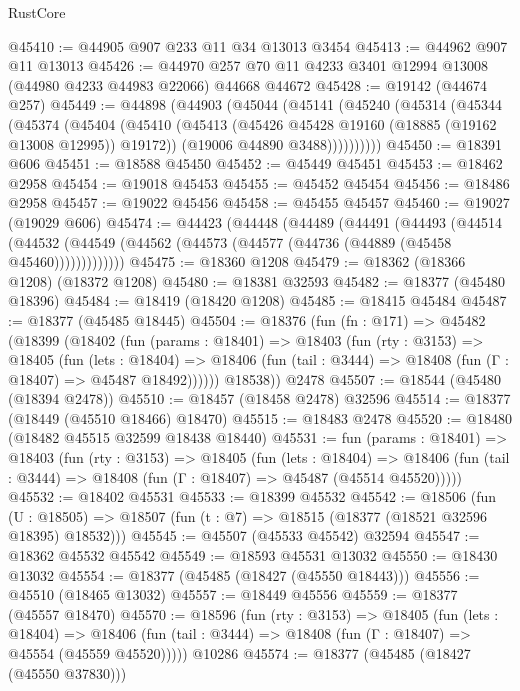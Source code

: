 \begin{lexlean}{RustCore}
\begin{coremodule}
@45410 := @44905 @907 @233 @11 @34 @13013 @3454
@45413 := @44962 @907 @11 @13013
@45426 := @44970 @257 @70 @11 @4233 @3401 @12994 @13008 (@44980 @4233 @44983 @22066) @44668 @44672
@45428 := @19142 (@44674 @257)
@45449 := @44898
    (@44903
      (@45044
        (@45141
          (@45240
            (@45314
              (@45344
                (@45374
                  (@45404
                    (@45410
                      (@45413 (@45426 @45428 @19160 (@18885 (@19162 @13008 @12995)) @19172))
                      (@19006 @44890 @3488))))))))))
@45450 := @18391 @606
@45451 := @18588 @45450
@45452 := @45449 @45451
@45453 := @18462 @2958
@45454 := @19018 @45453
@45455 := @45452 @45454
@45456 := @18486 @2958
@45457 := @19022 @45456
@45458 := @45455 @45457
@45460 := @19027 (@19029 @606)
@45474 := @44423
    (@44448
      (@44489
        (@44491
          (@44493
            (@44514
              (@44532 (@44549 (@44562 (@44573 (@44577 (@44736 (@44889 (@45458 @45460)))))))))))))
@45475 := @18360 @1208
@45479 := @18362 (@18366 @1208) (@18372 @1208)
@45480 := @18381 @32593
@45482 := @18377 (@45480 @18396)
@45484 := @18419 (@18420 @1208)
@45485 := @18415 @45484
@45487 := @18377 (@45485 @18445)
@45504 := @18376
    (fun (fn : @171) =>
    @45482
      (@18399
        (@18402
          (fun (params : @18401) =>
          @18403
            (fun (rty : @3153) =>
            @18405
              (fun (lets : @18404) =>
              @18406 (fun (tail : @3444) => @18408 (fun (Γ : @18407) => @45487 @18492))))))
        @18538))
    @2478
@45507 := @18544 (@45480 (@18394 @2478))
@45510 := @18457 (@18458 @2478) @32596
@45514 := @18377 (@18449 (@45510 @18466) @18470)
@45515 := @18483 @2478
@45520 := @18480 (@18482 @45515 @32599 @18438 @18440)
@45531 := fun (params : @18401) =>
  @18403
    (fun (rty : @3153) =>
    @18405
      (fun (lets : @18404) =>
      @18406 (fun (tail : @3444) => @18408 (fun (Γ : @18407) => @45487 (@45514 @45520)))))
@45532 := @18402 @45531
@45533 := @18399 @45532
@45542 := @18506
    (fun (U : @18505) => @18507 (fun (t : @7) => @18515 (@18377 (@18521 @32596 @18395) @18532)))
@45545 := @45507 (@45533 @45542) @32594
@45547 := @18362 @45532 @45542
@45549 := @18593 @45531 @13032
@45550 := @18430 @13032
@45554 := @18377 (@45485 (@18427 (@45550 @18443)))
@45556 := @45510 (@18465 @13032)
@45557 := @18449 @45556
@45559 := @18377 (@45557 @18470)
@45570 := @18596
    (fun (rty : @3153) =>
    @18405
      (fun (lets : @18404) =>
      @18406 (fun (tail : @3444) => @18408 (fun (Γ : @18407) => @45554 (@45559 @45520)))))
    @10286
@45574 := @18377 (@45485 (@18427 (@45550 @37830)))

\end{coremodule}
\end{lexlean}
